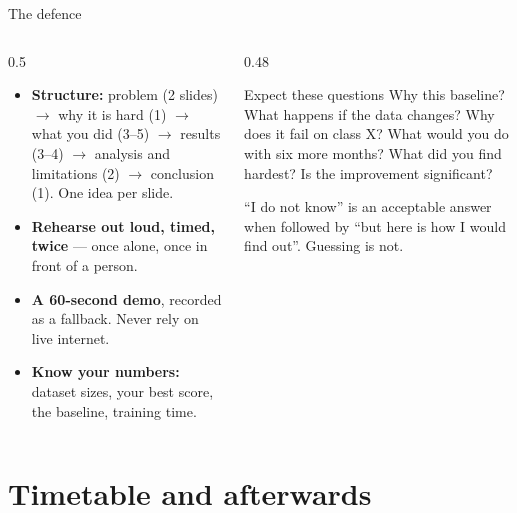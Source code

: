 \documentclass[aspectratio=169,11pt]{beamer}
\newcommand{\key}[1]{\textbf{\color{brand}#1}}
\begin{document}
\begin{frame}{The defence}
\begin{columns}[T]
\begin{column}{0.5\textwidth}
\footnotesize
\begin{itemize}
  \item \key{Structure:} problem (2 slides) $\rightarrow$ why it is hard (1)
        $\rightarrow$ what you did (3--5) $\rightarrow$ results (3--4)
        $\rightarrow$ analysis and limitations (2) $\rightarrow$ conclusion
        (1). One idea per slide.
  \item \key{Rehearse out loud, timed, twice} --- once alone, once in front of
        a person.
  \item \key{A 60-second demo}, recorded as a fallback. Never rely on live
        internet.
  \item \key{Know your numbers:} dataset sizes, your best score, the baseline,
        training time.
\end{itemize}
\end{column}
\begin{column}{0.48\textwidth}
\begin{block}{Expect these questions}
\footnotesize
Why this baseline? What happens if the data changes? Why does it fail on class
X? What would you do with six more months? What did you find hardest? Is the
improvement significant?
\end{block}
\begin{alertblock}{}
\footnotesize
``I do not know'' is an acceptable answer when followed by ``but here is how I
would find out''. Guessing is not.
\end{alertblock}
\end{column}
\end{columns}
\end{frame}

\section{Timetable and afterwards}
\end{document}
